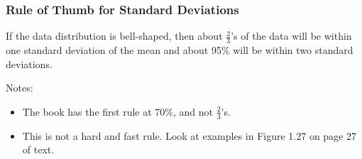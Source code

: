 \documentclass[handout]{beamer}
\newcommand{\blue}[1]{\textcolor{blue2}{#1}}
\begin{document}
\begin{frame}[fragile]
\frametitle{Rule of Thumb for Standard Deviations}

If the data distribution is bell-shaped, then about \blue{$\frac{2}{3}$'s of the data will be within one standard deviation of the mean} and about \blue{95\% will be within two standard deviations}.

\vspace{0.5cm}

\pause Notes:
\begin{itemize}
\pause\item The book has the first rule at 70\%, and not $\frac{2}{3}$'s.  
\pause\item This is not a hard and fast rule.  Look at examples in Figure 1.27 on page 27 of text.  
\end{itemize}

\end{frame}
\end{document}
